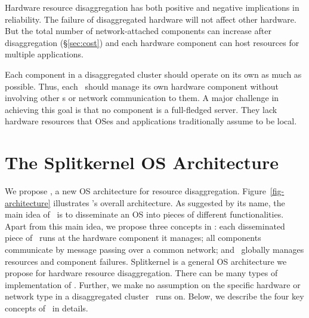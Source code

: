 \documentclass[10pt,times,twocolumn]{z2-article}
\begin{document}
Hardware resource disaggregation has both positive and negative implications in reliability.
The failure of disaggregated hardware will not affect other hardware.
But the total number of network-attached components can increase after disaggregation (\S\ref{sec:cost})
and each hardware component can host resources for multiple applications.


Each component in a disaggregated cluster should operate on its own as much as possible.
Thus, each \microos\ should manage its own hardware component
without involving other \microos{}s or network communication to them.
A major challenge in achieving this goal is that no component is a full-fledged server. 
They lack hardware resources that OSes and applications traditionally assume to be local.

\fi
\section{The Splitkernel OS Architecture}
\label{sec:design}

We propose {\em \splitkernel}, a new OS architecture for resource disaggregation. 
Figure~\ref{fig-architecture} illustrates \splitkernel's overall architecture.
As suggested by its name, the main idea of \splitkernel\ is to disseminate an OS 
into pieces of different functionalities.
Apart from this main idea, we propose three concepts in \splitkernel:
each disseminated piece of \splitkernel\ runs at the hardware component it manages;
all components communicate by message passing over a common network;
and \splitkernel\ globally manages resources and component failures.
Splitkernel is a general OS architecture we propose for hardware resource disaggregation.
There can be many types of implementation of \splitkernel.
Further, we make no assumption on the specific hardware or network type in a disaggregated cluster \splitkernel\ runs on.
Below, we describe the four key concepts of \splitkernel\ in details.
\end{document}
